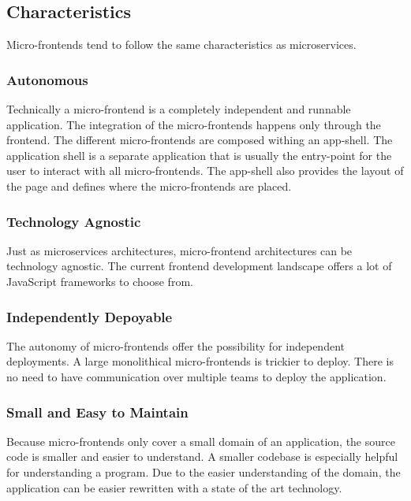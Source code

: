 \subsection{Characteristics}

Micro-frontends tend to follow the same characteristics as microservices.

\subsubsection{Autonomous}

Technically a micro-frontend is a completely independent and runnable application.
The integration of the micro-frontends happens only through the frontend. The different micro-frontends are composed withing an app-shell. The application shell is a separate application that is usually the entry-point for the user to interact with all micro-frontends. The app-shell also provides the layout of the page and defines where the micro-frontends are placed. \cite{book:2020:geers:micro-frontends-in-action}

\subsubsection{Technology Agnostic}

Just as microservices architectures, micro-frontend architectures can be technology agnostic. The current frontend development landscape offers a lot of JavaScript frameworks to choose from.

\subsubsection{Independently Depoyable}

The autonomy of micro-frontends offer the possibility for independent deployments. A large monolithical micro-frontends is trickier to deploy. There is no need to have communication over multiple teams to deploy the application.


\subsubsection{Small and Easy to Maintain}

Because micro-frontends only cover a small domain of an application, the source code is smaller and easier to understand. A smaller codebase is especially helpful for understanding a program. 
Due to the easier understanding of the domain, the application can be easier rewritten with a state of the art technology. \cite{book:2020:geers:micro-frontends-in-action}

